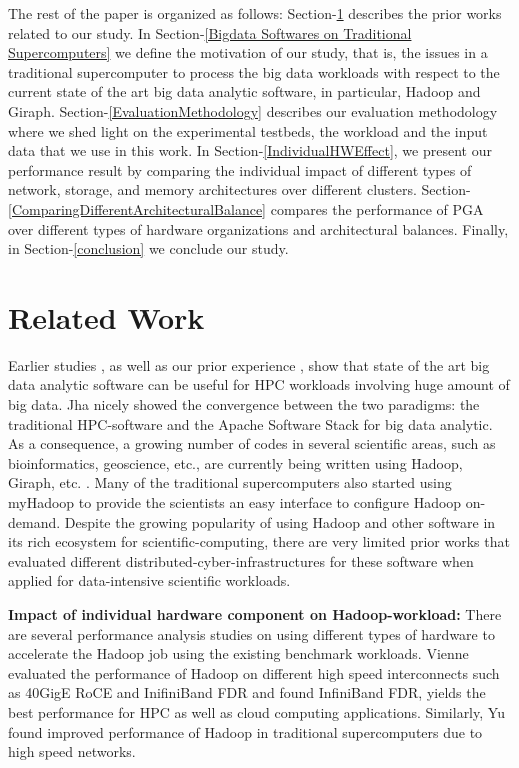 \documentclass[conference]{IEEEtran}
\begin{document}
The rest of the paper is organized as follows:
Section-\ref{Related Work} describes the prior works related to our study. 
In Section-\ref{Bigdata Softwares on Traditional Supercomputers} we define the motivation of our study, that is, the issues in a traditional supercomputer to process the big data workloads with respect to the current state of the art big data analytic software, in particular, Hadoop and Giraph. Section-\ref{EvaluationMethodology} describes our evaluation methodology where we shed light on the experimental testbeds, the workload and the input data that we use in this work. In Section-\ref{IndividualHWEffect}, we present our performance result by comparing the individual impact of different types of network, storage, and memory architectures over different clusters. Section-\ref{ComparingDifferentArchitecturalBalance} compares the performance of PGA over different types of hardware organizations and architectural balances. Finally, in Section-\ref{conclusion} we conclude our study.

\section {Related Work} \label{Related Work}
Earlier studies \cite{schadoop:fadika} \cite{schadoop:jha}, as well as our prior experience \cite{DBLP:conf/icpads/SatishKPPS14}, \cite{kondikoppa2012network} show that state of the art big data analytic software can be useful for HPC workloads involving huge amount of big data. Jha \cite{schadoop:jha} nicely showed the convergence between the two paradigms: the traditional HPC-software and the Apache Software Stack for big data analytic. As a consequence, a growing number of codes in several scientific areas, such as bioinformatics, geoscience, etc., are currently being written using Hadoop, Giraph, etc. \cite{fw:myhadoop}. Many of the traditional supercomputers also started using myHadoop \cite{fw:myhadoop} to provide the scientists an easy interface to configure Hadoop on-demand. Despite the growing popularity of using Hadoop and other software in its rich ecosystem for scientific-computing, there are very limited prior works that evaluated different distributed-cyber-infrastructures for these software when applied for data-intensive scientific workloads.

\textbf{Impact of individual hardware component on Hadoop-workload:}
There are several performance analysis studies on using different types of hardware to accelerate the Hadoop job using the existing benchmark workloads. Vienne \cite{ethib:vienne} evaluated the performance of Hadoop on different high speed interconnects such as 40GigE RoCE and InifiniBand FDR and found InfiniBand FDR, yields the best performance for HPC as well as cloud computing applications. Similarly, Yu \cite{ethib:yu} found improved performance of Hadoop in traditional supercomputers due to high speed networks.
\end{document}
